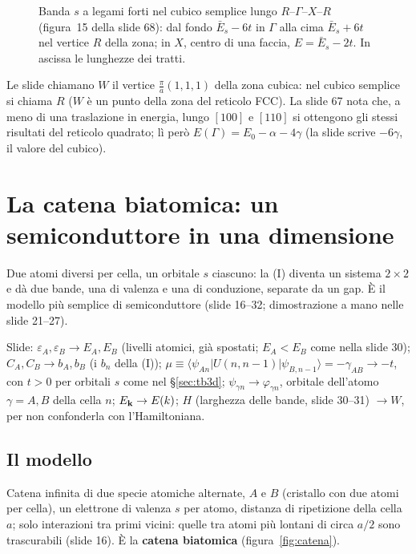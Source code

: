 \documentclass[11pt,a4paper]{article}
\begin{document}
\begin{figure}[tbp]
\centering
{}
\caption{Banda $s$ a legami forti nel cubico semplice lungo $R$--$\Gamma$--$X$--$R$ (figura~15 della slide 68): dal fondo $\bar E_s-6t$ in $\Gamma$ alla
cima $\bar E_s+6t$ nel vertice $R$ della zona; in $X$, centro di una faccia, $E=\bar E_s-2t$. In ascissa le lunghezze dei tratti.}\label{fig:tbsc}
\end{figure}

\begin{osservazione}[slide 66--68]
Le slide chiamano $W$ il vertice $\frac\pi a(1,1,1)$ della zona cubica: nel cubico semplice si chiama $R$ ($W$ è un punto della zona del reticolo FCC).
La slide 67 nota che, a meno di una traslazione in energia, lungo $[100]$ e $[110]$ si ottengono gli stessi risultati del reticolo quadrato; lì però
$E(\Gamma)=E_0-\alpha-4\gamma$ (la slide scrive $-6\gamma$, il valore del cubico).
\end{osservazione}

\section{La catena biatomica: un semiconduttore in una dimensione}\label{sec:biat}
Due atomi diversi per cella, un orbitale $s$ ciascuno: la (I) diventa un sistema $2\times2$ e dà due bande, una di valenza e una di conduzione,
separate da un gap. È il modello più semplice di semiconduttore (slide 16--32; dimostrazione a mano nelle slide 21--27).

\begin{osservazione}[notazione]
Slide: $\varepsilon_A,\varepsilon_B\to E_A,E_B$ (livelli atomici, già spostati; $E_A<E_B$ come nella slide 30); $C_A,C_B\to b_A,b_B$ (i $b_n$ della
(I)); $\mu\equiv\langle\psi_{An}|U(n,n-1)|\psi_{B,n-1}\rangle=-\gamma_{AB}\to-t$, con $t>0$ per orbitali $s$ come nel §\ref{sec:tb3d};
$\psi_{\gamma n}\to\varphi_{\gamma n}$, orbitale dell'atomo $\gamma=A,B$ della cella $n$; $E_{\mathbf k}\to E(k)$; $H$ (larghezza delle bande, slide 30--31)
$\to W$, per non confonderla con l'Hamiltoniana.
\end{osservazione}

\subsection{Il modello}
Catena infinita di due specie atomiche alternate, $A$ e $B$ (cristallo con due atomi per cella), un elettrone di valenza $s$ per atomo, distanza di
ripetizione della cella $a$; solo interazioni tra primi vicini: quelle tra atomi più lontani di circa $a/2$ sono trascurabili (slide 16). È la
\textbf{catena biatomica}  (figura~\ref{fig:catena}).
\end{document}
